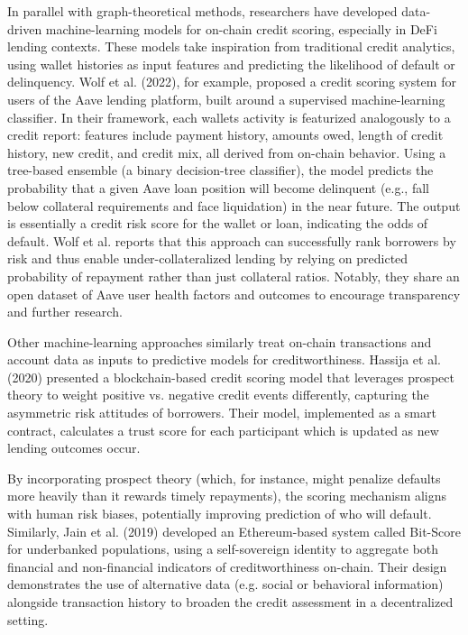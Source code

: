 \documentclass[
]{article}
\begin{document}
In parallel with graph-theoretical methods, researchers have developed data-driven machine-learning models for on-chain credit scoring, especially in DeFi lending contexts. These models take inspiration from traditional credit analytics, using wallet histories as input features and predicting the likelihood of default or delinquency. Wolf et al. (2022), for example, proposed a credit scoring system for users of the Aave lending platform, built around a supervised machine-learning classifier. In their framework, each wallet\textquotesingle s activity is featurized analogously to a credit report: features include payment history, amounts owed, length of credit history, new credit, and credit mix, all derived from on-chain behavior. Using a tree-based ensemble (a binary decision-tree classifier), the model predicts the probability that a given Aave loan position will become delinquent (e.g., fall below collateral requirements and face liquidation) in the near future. The output is essentially a credit risk score for the wallet or loan, indicating the odds of default. Wolf et al. reports that this approach can successfully rank borrowers by risk and thus enable under-collateralized lending by relying on predicted probability of repayment rather than just collateral ratios. Notably, they share an open dataset of Aave user health factors and outcomes to encourage transparency and further research.

Other machine-learning approaches similarly treat on-chain transactions and account data as inputs to predictive models for creditworthiness. Hassija et al. (2020) presented a blockchain-based credit scoring model that leverages prospect theory to weight positive vs. negative credit events differently, capturing the asymmetric risk attitudes of borrowers. Their model, implemented as a smart contract, calculates a trust score for each participant which is updated as new lending outcomes occur.

By incorporating prospect theory (which, for instance, might penalize defaults more heavily than it rewards timely repayments), the scoring mechanism aligns with human risk biases, potentially improving prediction of who will default. Similarly, Jain et al. (2019) developed an Ethereum-based system called Bit-Score for underbanked populations, using a self-sovereign identity to aggregate both financial and non-financial indicators of creditworthiness on-chain. Their design demonstrates the use of alternative data (e.g. social or behavioral information) alongside transaction history to broaden the credit assessment in a decentralized setting.
\end{document}
